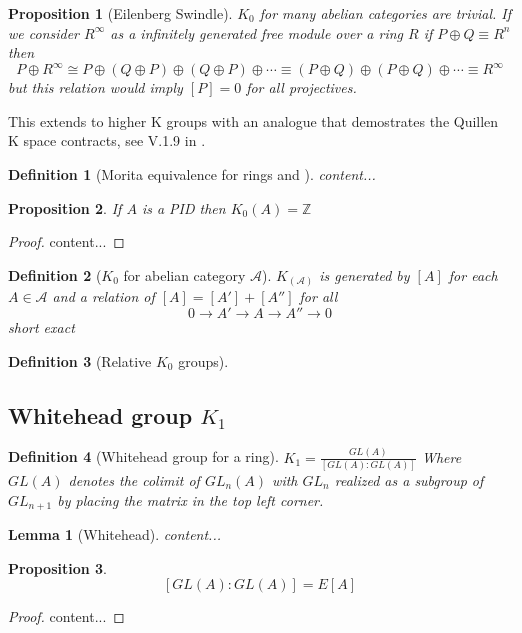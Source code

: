\documentclass[12pt]{article}
\numberwithin{equation}{section}
\newcommand{\Z}{\mathbb{Z}}
\newtheorem{definition}{Definition}[section]
\newtheorem{lemma}[theorem]{Lemma}
\newtheorem{proposition}{Proposition}[section]
\begin{document}
	\begin{proposition}[Eilenberg Swindle]
		$K_0$ for many abelian categories are trivial. If we consider $R^\infty$ as a infinitely generated free module over a ring $R$ if $P \oplus Q \equiv R^n$ then \[ P \oplus R^\infty \cong P \oplus (Q \oplus P) \oplus (Q \oplus P) \oplus \cdots \equiv (P \oplus Q) \oplus (P \oplus Q) \oplus \cdots \equiv R^\infty \] but this relation would imply $[P]=0 $ for all projectives. 
	\end{proposition}
	This extends to higher K groups with an analogue that demostrates the Quillen K space contracts, see V.1.9 in \cite{weibel2013k}.
	
	\begin{definition}[Morita equivalence for rings and ]
		content...
	\end{definition}
	
	\begin{proposition}
	If $A$ is a PID then $K_0(A)=\Z$
	\end{proposition}
	\begin{proof}
		content...
	\end{proof}
	
	\begin{definition}[$K_0$ for abelian category $\mathcal{A}$]
		$K_(\mathcal A)$ is generated by $[A]$ for each $A \in \mathcal{A}$ and a relation of $[A]=[A']+[A'']$ for all \[ 0 \to A' \to A \to A'' \to 0 \]
		short exact
	\end{definition}
	\begin{definition}[Relative $K_0$ groups]
	\end{definition}
	\subsection{Whitehead group $K_1$}
	\begin{definition}[Whitehead group for a ring]
		$K_1= \frac{GL(A)}{[GL(A):GL(A)]}$
		Where $GL(A)$ denotes the colimit of $GL_n(A)$ with $GL_{n}$ realized as a subgroup of $GL_{n+1}$ by placing the matrix in the top left corner. 
	\end{definition}
	
	\begin{lemma}[Whitehead]
		content...
	\end{lemma}
	\begin{proposition}
		\[ [GL(A):GL(A)]=E[A] \]
	\end{proposition}
	\begin{proof}
		content...
	\end{proof}	
	
\end{document}
